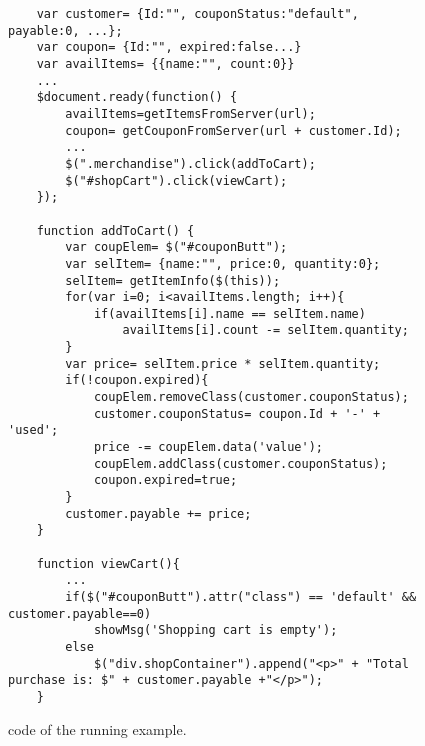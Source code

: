 \begin{figure}
\begin{lstlisting}
	var customer= {Id:"", couponStatus:"default", payable:0, ...};
	var coupon= {Id:"", expired:false...}
	var availItems= {{name:"", count:0}}
	...
	$document.ready(function() {
		availItems=getItemsFromServer(url);
		coupon= getCouponFromServer(url + customer.Id);		
		...	
		$(".merchandise").click(addToCart);
		$("#shopCart").click(viewCart);
	});
	
	function addToCart() {
		var coupElem= $("#couponButt");
		var selItem= {name:"", price:0, quantity:0};
		selItem= getItemInfo($(this));
		for(var i=0; i<availItems.length; i++){
			if(availItems[i].name == selItem.name)
				availItems[i].count -= selItem.quantity;		
		}
		var price= selItem.price * selItem.quantity;
		if(!coupon.expired){
			coupElem.removeClass(customer.couponStatus);
			customer.couponStatus= coupon.Id + '-' + 'used';
			price -= coupElem.data('value');	
			coupElem.addClass(customer.couponStatus);
			coupon.expired=true;	
		} 	
		customer.payable += price;
	}

	function viewCart(){
		...
		if($("#couponButt").attr("class") == 'default' && customer.payable==0)
			showMsg('Shopping cart is empty');
		else
			$("div.shopContainer").append("<p>" + "Total purchase is: $" + customer.payable +"</p>");
	}
\end{lstlisting}
\caption{\javascript code of the running example.}
\label{Fig:example}
\end{figure}